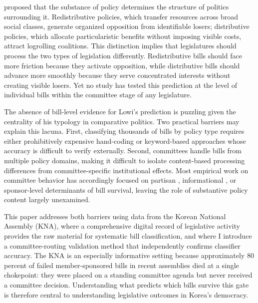 \documentclass[11pt]{article}
\begin{document}
\citet{lowi1964} proposed that the substance of policy determines the structure of politics surrounding it. Redistributive policies, which transfer resources across broad social classes, generate organized opposition from identifiable losers; distributive policies, which allocate particularistic benefits without imposing visible costs, attract logrolling coalitions. This distinction implies that legislatures should process the two types of legislation differently. Redistributive bills should face more friction because they activate opposition, while distributive bills should advance more smoothly because they serve concentrated interests without creating visible losers. Yet no study has tested this prediction at the level of individual bills within the committee stage of any legislature.

The absence of bill-level evidence for Lowi's prediction is puzzling given the centrality of his typology in comparative politics. Two practical barriers may explain this lacuna. First, classifying thousands of bills by policy type requires either prohibitively expensive hand-coding or keyword-based approaches whose accuracy is difficult to verify externally. Second, committees handle bills from multiple policy domains, making it difficult to isolate content-based processing differences from committee-specific institutional effects. Most empirical work on committee behavior has accordingly focused on partisan \citep{cox2005}, informational \citep{krehbiel1991}, or sponsor-level \citep{volden2014} determinants of bill survival, leaving the role of substantive policy content largely unexamined.

This paper addresses both barriers using data from the Korean National Assembly (KNA), where a comprehensive digital record of legislative activity provides the raw material for systematic bill classification, and where I introduce a committee-routing validation method that independently confirms classifier accuracy. The KNA is an especially informative setting because approximately 80 percent of failed member-sponsored bills in recent assemblies died at a single chokepoint: they were placed on a standing committee agenda but never received a committee decision. Understanding what predicts which bills survive this gate is therefore central to understanding legislative outcomes in Korea's democracy.
\end{document}
